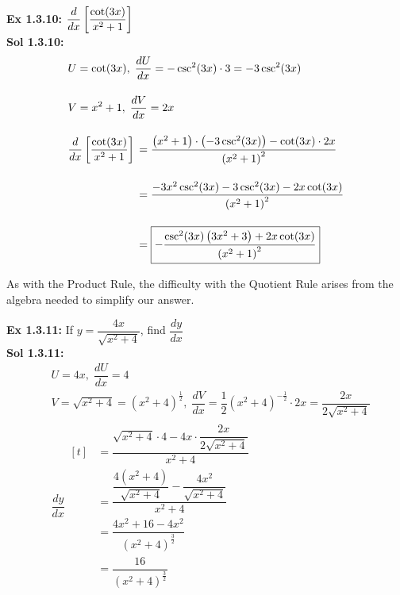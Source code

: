 \textbf{Ex 1.3.10: } $\dfrac{d}{dx} \left[\dfrac{\cot (3x)}{x^2 + 1}\right]$ \\[11pt]
\textbf{Sol 1.3.10: } \begin{align*}
    & U = \cot (3x), \; \dfrac{dU}{dx} = -\csc^2 (3x) \cdot 3 = -3\csc^2 (3x)\\[11pt]
    & V = x^2 + 1, \; \dfrac{dV}{dx} = 2x \\[11pt]
    & \dfrac{d}{dx} \left[\dfrac{\cot (3x)}{x^2 + 1}\right] \begin{aligned}[t]
        & = \dfrac{\left(x^2 + 1\right) \cdot \left(-3\csc^2 (3x)\right) - \cot (3x) \cdot 2x}{\left(x^2 + 1\right)^2} \\[11pt]
        & = \dfrac{-3x^2\csc^2 (3x) - 3\csc^2 (3x) - 2x\cot (3x)}{\left(x^2 + 1\right)^2} \\[11pt]
        & = \boxed{-\dfrac{\csc^{2}(3x)\left(3x^2 + 3\right) + 2x \cot(3x)}{\left(x^2 + 1\right)^2}}
    \end{aligned}
\end{align*}

As with the Product Rule, the difficulty with the Quotient Rule arises from the algebra needed to simplify our answer. \par

\textbf{Ex 1.3.11: } If $y = \dfrac{4x}{\sqrt{x^2 + 4}}$, find $\dfrac{dy}{dx}$ \\[11pt]
\textbf{Sol 1.3.11: } \begin{align*}
    & U = 4x, \; \dfrac{dU}{dx} = 4 \\[11pt]
    & V = \sqrt{x^2 + 4} = \left(x^2 + 4\right)^\frac{1}{2}, \; \dfrac{dV}{dx} = \dfrac{1}{2}\left(x^2 + 4\right)^{-\frac{1}{2}} \cdot 2x = \dfrac{2x}{2\sqrt{x^2 + 4}} \\[11pt]
    & \dfrac{dy}{dx} \begin{aligned}[t]
        & = \dfrac{\sqrt{x^2 + 4} \cdot 4 - 4x \cdot \dfrac{2x}{2\sqrt{x^2 + 4}}}{x^2 + 4} \\[11pt]
        & = \dfrac{\dfrac{4\left(x^2 + 4\right)}{\sqrt{x^2 + 4}} - \dfrac{4x^2}{\sqrt{x^2 + 4}}}{x^2 + 4} \\[11pt]
        & = \dfrac{4x^2 + 16 - 4x^2}{\left(x^2 + 4\right)^\frac{3}{2}} \\[11pt]
        & = \boxed{\dfrac{16}{\left(x^2 + 4\right)^\frac{3}{2}}}
    \end{aligned}
\end{align*}

